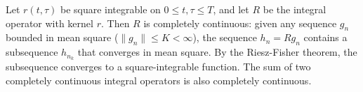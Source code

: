 Let $r(t,\tau)$ be square integrable on $0 \leq t, \tau \leq T$, and let $R$ be the integral operator with kernel $r$. Then $R$ is completely continuous: given any sequence $g_n$ bounded in mean square ($\|g_n\| \leq K < \infty$), the sequence $h_n = R g_n$ contains a subsequence $h_{n_k}$ that converges in mean square. By the Riesz-Fisher theorem, the subsequence converges to a square-integrable function. The sum of two completely continuous integral operators is also completely continuous.

